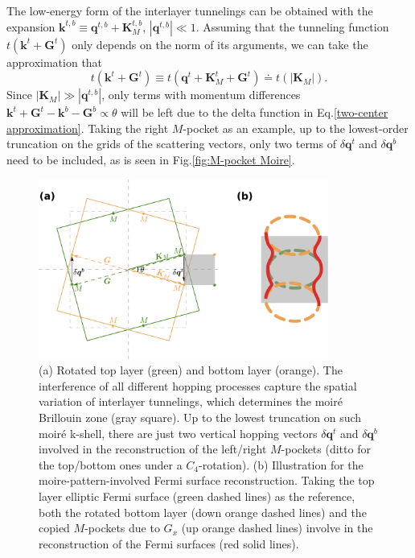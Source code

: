 \begin{subappendices}
The low-energy form of the interlayer tunnelings can be obtained with the expansion $\bm{k}^{t,b}\equiv\bm{q}^{t,b}+\bm{K}_M^{t,b}$, $|\bm{q}^{t,b}|\ll1$. Assuming that the tunneling function $t(\bm{k}^t+\bm{G}^t)$ only depends on the norm of its arguments, we can take the approximation that
\begin{equation*}
	t(\bm{k}^t+\bm{G}^t)\equiv t(\bm{q}^t+\bm{K}_M^t+\bm{G}^t)\doteq t(|\bm{K}_M|).
\end{equation*}
Since $|\bm{K}_M|\gg|\bm{q}^{t,b}|$, only terms with momentum differences $\bm{k}^t+\bm{G}^t-\bm{k}^b-\bm{G}^b\propto\theta$ will be left due to the delta function in Eq.\eqref{two-center approximation}. Taking the right $M$-pocket as an example, up to the lowest-order truncation on the grids of the scattering vectors, only two terms of $\delta\bm{q}^t$ and $\delta\bm{q}^b$ need to be included, as is seen in Fig.\ref{fig:M-pocket Moire}.
\begin{figure}[!htp]
	\centering
	\includegraphics[width=0.85\textwidth]{contents/SATHE/figures/rotated_M-pocket.pdf}
	\caption{(a) Rotated top layer (green) and bottom layer (orange). The interference of all different hopping processes capture the spatial variation of interlayer tunnelings, which determines the moir\'{e} Brillouin zone (gray square). Up to the lowest truncation on such moir\'{e} k-shell, there are just two vertical hopping vectors $\delta\bm{q}^t$ and $\delta\bm{q}^b$ involved in the reconstruction of the left/right $M$-pockets (ditto for the top/bottom ones under a $C_4$-rotation). (b) Illustration for the moire-pattern-involved Fermi surface reconstruction. Taking the top layer elliptic Fermi surface (green dashed lines) as the reference, both the rotated bottom layer (down orange dashed lines) and the copied $M$-pockets due to $G_x$ (up orange dashed lines) involve in the reconstruction of the Fermi surfaces (red solid lines).}

\end{figure}
\end{subappendices}
